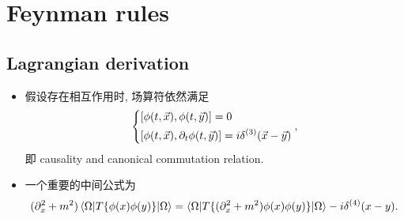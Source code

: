 \chapter{Feynman rules}
\section{Lagrangian derivation}
\begin{itemize}
	\item 假设存在相互作用时, 场算符依然满足
	\begin{equation}
		\begin{dcases}
			[\phi(t, \vec{x}), \phi(t, \vec{y})] = 0 \\
			[\phi(t, \vec{x}), \partial_t \phi(t, \vec{y})] = i \delta^{(3)}(\vec{x} - \vec{y})
		\end{dcases},
	\end{equation}
	即 causality and canonical commutation relation.
	
	\item 一个重要的中间公式为
	\begin{equation} \label{Feynman rules.1.2}
		(\partial_x^2 + m^2) \braket{\Omega | T\{\phi(x) \phi(y)\} | \Omega} = \braket{\Omega | T\{(\partial_x^2 + m^2) \phi(x) \phi(y)\} | \Omega} - i \delta^{(4)}(x - y).
	\end{equation}
	

\end{itemize}
